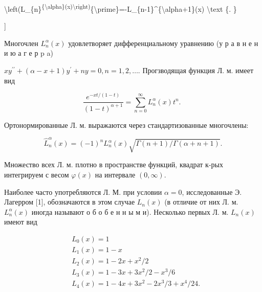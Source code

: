 \documentclass[10pt]{article}
\begin{document}
\textbackslash left(L\_\{n\}\textsuperscript{\{\textbackslash alpha\}(x)\textbackslash right)}\{\textbackslash prime\}=-L\_\{n-1\}\^{}\{\textbackslash alpha+1\}(x) \textbackslash text \{. \}

]



Многочлен $L_{n}^{\alpha}(x)$ удовлетворяет дифференциальному уравнению (у р а в н е н и ю а г е р p a)



$x y^{\prime \prime}+(\alpha-x+1) y^{\prime}+n y=0, n=1,2, \ldots$. Прогзводящая функция Л. м. имеет вид



\[

\frac{e^{-x t /(1-t)}}{(1-t)^{\alpha+1}}=\sum_{n=0}^{\infty} L_{n}^{\alpha}(x) t^{n} \text {. }

\]



Ортонормированные Л. м. выражаются через стандартизованные многочлены:



\[

\hat{L}_{n}^{\alpha}(x)=(-1)^{n} L_{n}^{\alpha}(x) \sqrt{\Gamma(n+1) / \Gamma(\alpha+n+1)} .

\]



Множество всех Л. м. плотно в пространстве функций, квадрат к-рых интегрируем с весом $\varphi(x)$ на интервале $(0, \infty)$.



Наиболее часто употребляются Л. М. при условии $\alpha=0$, исследованные Э. Лагерром [1], обозначаются в этом случае $L_{n}(x)$ (в отличие от них Л. м. $L_{n}^{\alpha}(x)$ иногда называют о б о б е н н ы м и). Несколько первых Л. м. $L_{n}(x)$ имеют вид



\[

\begin{aligned}

& L_{0}(x)=1 \\

& L_{1}(x)=1-x \\

& L_{2}(x)=1-2 x+x^{2} / 2 \\

& L_{3}(x)=1-3 x+3 x^{2} / 2-x^{3} / 6 \\

& L_{4}(x)=1-4 x+3 x^{2}-2 x^{3} / 3+x^{4} / 24 .

\end{aligned}

\]
\end{document}

